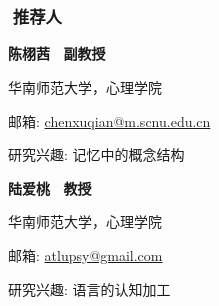 \documentclass[a4paper, 12pt]{ctexart}
\begin{document}
\  \par
\  \par


\subsubsection*{ \ \ 推荐人}




\begin{multicols}{2}
    
    \ \ \textbf{陈栩茜 \ 副教授} \par
    \ \ 华南师范大学，心理学院 \par
    \ \ 邮箱: \href{mailto: chenxuqian@m.scnu.edu.cn}{chenxuqian@m.scnu.edu.cn} \par
    \ \ 研究兴趣: 记忆中的概念结构	\par
    
    \columnbreak

    \ \ \textbf{陆爱桃 \ 教授}  \par
    \ \ 华南师范大学，心理学院 \par
    \ \ 邮箱: \href{mailto: atlupsy@gmail.com}{atlupsy@gmail.com} \par
    \ \ 研究兴趣: 语言的认知加工 \par
    
    \end{multicols}
\end{document}
